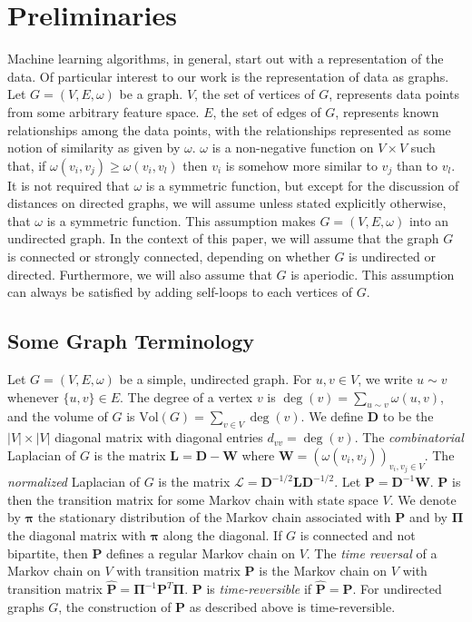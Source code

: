 \documentclass[10pt,twocolumn]{article}
\numberwithin{equation}{section}
\begin{document}
\section{Preliminaries}
Machine learning algorithms, in general, start out with a
representation of the data. Of particular interest to our work is the
representation of data as graphs. Let $G = (V,E,\omega)$ be a
graph. $V$, the set of vertices of $G$, represents data points from
some arbitrary feature space. $E$, the set of edges of $G$, represents
known relationships among the data points, with the relationships
represented as some notion of similarity as given by
$\omega$. $\omega$ is a non-negative function on $V \times V$ such
that, if $\omega(v_i, v_j) \geq \omega(v_i,v_l)$ then $v_i$ is somehow
more similar to $v_j$ than to $v_l$. It is not required that $\omega$
is a symmetric function, but except for the discussion of distances on
directed graphs, we will assume unless stated explicitly otherwise,
that $\omega$ is a symmetric function. This assumption makes $G =
(V,E,\omega)$ into an undirected graph. In the context of this paper,
we will assume that the graph $G$ is connected
or strongly connected, depending on whether $G$ is undirected or
directed. Furthermore, we will also assume that $G$ is aperiodic. This
assumption can always be satisfied by adding self-loops to each
vertices of $G$. 
\subsection{Some Graph Terminology}
\label{sec:some-graphs-term}
Let $G = (V,E,\omega)$ be a simple, undirected graph. For $u,v \in V$,
we write $u \sim v$ whenever $\{u,v\} \in E$. The degree of a vertex
$v$ is $\deg(v) = \sum_{u \sim v}{\omega(u,v)}$, and the volume of $G$
is $\mathrm{Vol}(G) = \sum_{v \in V}{\deg(v)}$. We define $\mathbf{D}$
to be the $|V| \times |V|$ diagonal matrix with diagonal entries
$d_{vv} = \deg(v)$. The {\em combinatorial} Laplacian of $G$ is the
matrix $\mathbf{L} = \mathbf{D} - \mathbf{W}$ where $\mathbf{W} =
(\omega(v_i,v_j))_{v_i,v_j \in V}$. The {\em normalized} Laplacian of
$G$ is the matrix $\mathbf{\mathcal{L}} = \mathbf{D}^{-1/2} \mathbf{L}
\mathbf{D}^{-1/2}$. Let $\mathbf{P} =
\mathbf{D}^{-1}\mathbf{W}$. $\mathbf{P}$ is then the transition matrix
for some Markov chain with state space $V$. We denote by $\bm{\pi}$
the stationary distribution of the Markov chain associated with
$\mathbf{P}$ and by $\bm{\Pi}$ the diagonal matrix with $\bm{\pi}$
along the diagonal. If $G$ is connected and not bipartite, then
$\mathbf{P}$ defines a regular Markov chain on $V$. The {\em time
  reversal} of a Markov chain on $V$ with transition matrix
$\mathbf{P}$ is the Markov chain on $V$ with transition matrix
$\hat{\mathbf{P}} = \bm{\Pi}^{-1} \mathbf{P}^{T}
\bm{\Pi}$. $\mathbf{P}$ is {\em time-reversible} if $\hat{\mathbf{P}}
= \mathbf{P}$. For undirected graphs $G$, the construction of
$\mathbf{P}$ as described above is time-reversible.
\end{document}
